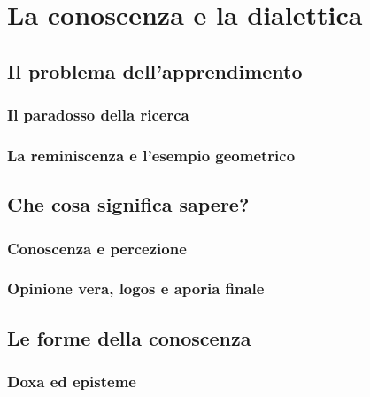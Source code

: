 \chapter{La conoscenza e la dialettica}
\label{cap:platone:conoscenza}

\section{Il problema dell'apprendimento}

\subsection{Il paradosso della ricerca}

\subsection{La reminiscenza e l'esempio geometrico}

\section{Che cosa significa sapere?}

\subsection{Conoscenza e percezione}

\subsection{Opinione vera, logos e aporia finale}

\section{Le forme della conoscenza}

\subsection{Doxa ed episteme}

